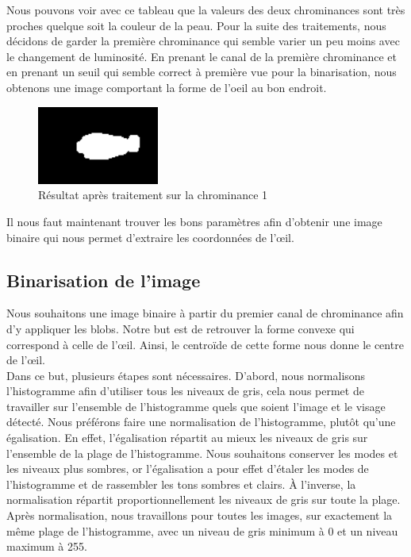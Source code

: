 Nous pouvons voir avec ce tableau que la valeurs des deux chrominances sont très proches quelque soit
la couleur de la peau. Pour la suite des traitements, nous décidons de garder la première chrominance qui semble
varier un peu moins avec le changement de luminosité. En prenant le canal de la première chrominance et en 
prenant un seuil qui semble correct à première vue pour la binarisation, nous obtenons une image comportant la forme de l'oeil au bon endroit.

\begin{figure}[H]
 \center
 \includegraphics[width=4cm]{image/result_yuv.png}
 \caption{Résultat après traitement sur la chrominance 1}
\end{figure}

Il nous faut maintenant trouver les bons paramètres afin d'obtenir une image binaire qui nous permet d'extraire les 
coordonnées de l'œil.

\subsection{Binarisation de l'image}
Nous souhaitons une image binaire à partir du premier canal de chrominance afin d'y appliquer les blobs. 
Notre but est de retrouver la forme convexe qui correspond à celle de l'œil. Ainsi, le centroïde de cette 
forme nous donne le centre de l'œil.\\

Dans ce but, plusieurs étapes sont nécessaires. D'abord, nous normalisons l'histogramme afin d'utiliser 
tous les niveaux de gris, cela nous permet de travailler sur l'ensemble de l'histogramme quels que soient
l'image et le visage détecté. Nous préférons faire une normalisation de l'histogramme, plutôt qu'une 
égalisation. En effet, l'égalisation répartit au mieux les niveaux de gris sur l'ensemble de 
la plage de l'histogramme. Nous souhaitons conserver les modes et les niveaux plus sombres, or l'égalisation 
a pour effet d'étaler les modes de l'histogramme et de rassembler les tons sombres et clairs. À l'inverse, 
la normalisation répartit proportionnellement les niveaux de gris sur toute la plage. 
Après normalisation, nous travaillons pour toutes les images, sur exactement la même plage de l'histogramme, 
avec un niveau de gris minimum à 0 et un niveau maximum à 255.\\


